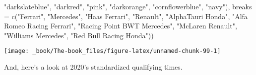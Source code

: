 \documentclass[
]{book}
\newenvironment{Shaded}{\begin{snugshade}}{\end{snugshade}}
\newcommand{\AttributeTok}[1]{\textcolor[rgb]{0.77,0.63,0.00}{#1}}
\newcommand{\FunctionTok}[1]{\textcolor[rgb]{0.00,0.00,0.00}{#1}}
\newcommand{\NormalTok}[1]{#1}
\newcommand{\StringTok}[1]{\textcolor[rgb]{0.31,0.60,0.02}{#1}}
\begin{document}
\begin{Shaded}
\begin{Highlighting}[]
                               \StringTok{"darkslateblue"}\NormalTok{, }
                                \StringTok{"darkred"}\NormalTok{,  }
                                \StringTok{"pink"}\NormalTok{, }
                                \StringTok{"darkorange"}\NormalTok{, }
                                \StringTok{"cornflowerblue"}\NormalTok{,}
                               \StringTok{"navy"}\NormalTok{),}
                     \AttributeTok{breaks =} \FunctionTok{c}\NormalTok{(}\StringTok{"Ferrari"}\NormalTok{,}
                                 \StringTok{"Mercedes"}\NormalTok{,}
                                 \StringTok{"Haas Ferrari"}\NormalTok{,}
                                 \StringTok{"Renault"}\NormalTok{,}
                                 \StringTok{"AlphaTauri Honda"}\NormalTok{,}
                                 \StringTok{"Alfa Romeo Racing Ferrari"}\NormalTok{, }
                                 \StringTok{"Racing Point BWT Mercedes"}\NormalTok{,}
                                 \StringTok{"McLaren Renault"}\NormalTok{,}
                                 \StringTok{"Williams Mercedes"}\NormalTok{,}
                                 \StringTok{"Red Bull Racing Honda"}\NormalTok{))}
\end{Highlighting}
\end{Shaded}

\begin{center}\texttt{[image: \_book/The-book\_files/figure-latex/unnamed-chunk-99-1]} \end{center}

And, here's a look at 2020's standardized qualifying times.
\end{document}
